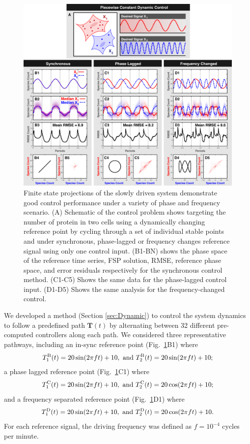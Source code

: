 \documentclass[12pt]{iopart}
\begin{document}
\begin{figure}
\begin{center}
\includegraphics[width=1\textwidth]{DynamicControl.pdf}
\vspace{-0.1in}
\caption{Finite state projections of the slowly driven system demonstrate good control performance under a variety of phase and frequency scenario. (A) Schematic of the control problem shows targeting the number of protein in two cells using a dynamically changing reference point by cycling through a set of individual stable points and under synchronous, phase-lagged or frequency changes reference signal using only one control input. (B1-BN) shows the phase space of the reference time series, FSP solution, RMSE, reference phase space, and error residuals respectively for the synchronous control method. (C1-C5) Shows the same data for the phase-lagged control input. (D1-D5) Shows the same analysis for the frequency-changed control.}
\label{CR}
\end{center}
\vspace{-0.2in}
\end{figure}

We developed a method (Section \ref{sec:Dynamic}) to control the system dynamics to follow a predefined path $\mathbf{T}(t)$ by alternating between 32 different pre-computed controllers along each path. We considered three representative pathways, including an in-sync reference point (Fig.\ \ref{CR}B1) where 
$$
T^{\rm B}_1(t) =20 \sin(2 \pi f t)+10,\textrm{ and } T^{\rm B}_2(t) = 20 \sin(2 \pi f t)+10;
$$
a phase lagged reference point (Fig.\ \ref{CR}C1) where
$$
T^{\rm C}_1(t)=20 \sin(2 \pi f t)+10,\textrm{ and } T^{\rm C}_2(t) =20 \cos(2 \pi f t)+10;
$$
and a frequency separated reference point (Fig.\ \ref{CR}D1) where
$$
T^{\rm D}_1(t)=20 \sin(2 \pi f t)+10,\textrm{ and } T^{\rm D}_2(t) =20 \cos(2 \pi f t)+10.
$$
For each reference signal, the driving frequency was defined as $f=10^{-4}$ cycles per minute.
\end{document}
